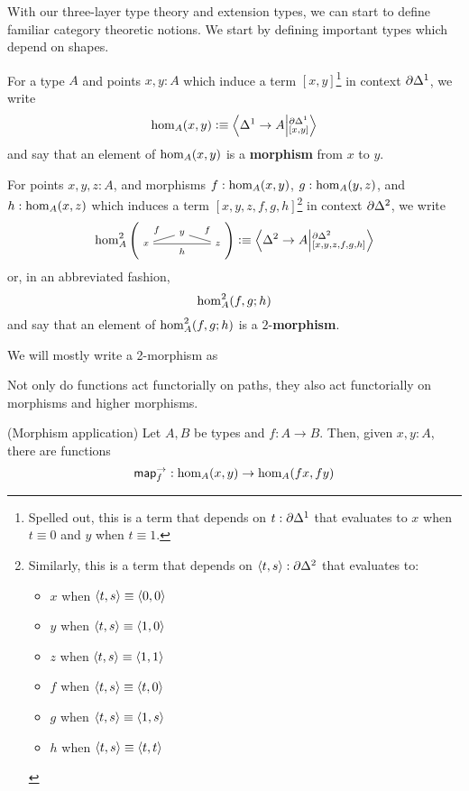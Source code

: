 \documentclass[main.tex]{subfiles}
\begin{document}
With our three-layer type theory and extension types, we can start to define familiar category theoretic notions. We start by defining important types which depend on shapes.

\begin{definition}
    For a type $A$ and points $x,y : A$ which induce a term $[x,y]$\footnote{Spelled out, this is a term that depends on $t : \pardo $ that evaluates to $x$ when $t \equiv 0$ and $y$ when $t \equiv 1$.} in context $\pardo$, we write
    $$\ho[A]{x}{y} \defeq \ndexten{\osx}{A}{\pardo}{[x,y]}$$
    and say that an element of $\ho[A]{x}{y}$ is a \textbf{morphism} from $x$ to $y$. 
\end{definition}
\begin{definition}
    For points $x,y,z : A$, and morphisms $f : \ho[A]{x}{y}$, $g : \ho[A]{y}{z}$, and $h : \ho[A]{x}{z}$ which induces a term $[x,y,z,f,g,h]$\footnote{Similarly, this is a term that depends on $\pair{t}{s} :\pardt$ that evaluates to:
    \begin{itemize}
        \item $x$ when $\pair{t}{s} \equiv \pair{0}{0}$ 
        \item $y$ when $\pair{t}{s} \equiv \pair{1}{0}$ 
        \item $z$ when $\pair{t}{s} \equiv \pair{1}{1}$
        \item $f$ when $\pair{t}{s} \equiv \pair{t}{0}$
        \item $g$ when $\pair{t}{s} \equiv \pair{1}{s}$
        \item $h$ when $\pair{t}{s} \equiv \pair{t}{t}$
    \end{itemize} } in context $\pardt$, we write
    $$\homtwo{A}(x,y,z,f,f,h) \defeq \ndexten{\tsx}{A}{\pardt}{[x,y,z,f,g,h]}$$
    or, in an abbreviated fashion,
    $$\homtwoshort{A}(x,y,z,f,g,h)$$
    and say that an element of $\homtwoshort{A}(x,y,z,f,g,h)$ is a $2$-\textbf{morphism}.
\end{definition}

\begin{remark}
    We will mostly write a 2-morphism as 
\end{remark} 

Not only do functions act functorially on paths, they also act functorially on morphisms and higher morphisms.
\begin{lemma}(Morphism application)
    Let $A,B$ be types and $f : A \to B$. Then, given $x,y : A$, there are functions 
    $$\maparrfunc{f} : \ho[A]{x}{y} \to \ho[A]{f x}{f y}$$
\end{lemma}
\end{document}
